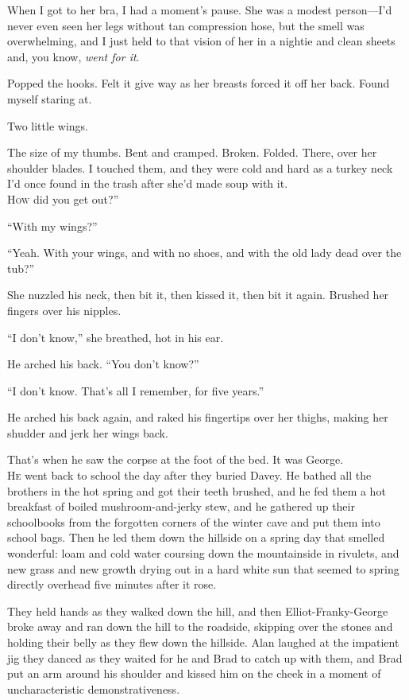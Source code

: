 \documentclass{article}
\begin{document}
When I got to her bra, I had a moment's pause.  She was a modest
person---I'd never even seen her legs without tan compression hose,
but the smell was overwhelming, and I just held to that vision of her
in a nightie and clean sheets and, you know, \textit{went for it}.

Popped the hooks.  Felt it give way as her breasts forced it off her
back.  Found myself staring at.

Two little wings.

The size of my thumbs.  Bent and cramped.  Broken.  Folded.  There,
over her shoulder blades.  I touched them, and they were cold and hard
as a turkey neck I'd once found in the trash after she'd made soup
with it.
\\
\lettrine[lines=3, lhang=.5, nindent=0pt, findent=2pt]{H}{ow}
did you get out?''

``With my wings?''

``Yeah.  With your wings, and with no shoes, and with the old lady
dead over the tub?''

She nuzzled his neck, then bit it, then kissed it, then bit it again. 
Brushed her fingers over his nipples.

``I don't know,'' she breathed, hot in his ear.

He arched his back.  ``You don't know?''

``I don't know.  That's all I remember, for five years.''

He arched his back again, and raked his fingertips over her thighs,
making her shudder and jerk her wings back.

That's when he saw the corpse at the foot of the bed.  It was George.
\\
\lettrine[lines=3, lhang=.5, nindent=0pt, findent=2pt]{H}{e} went back to school the day after they buried Davey.  He bathed all
the brothers in the hot spring and got their teeth brushed, and he fed
them a hot breakfast of boiled mushroom-and-jerky stew, and he
gathered up their schoolbooks from the forgotten corners of the winter
cave and put them into school bags.  Then he led them down the
hillside on a spring day that smelled wonderful:  loam and cold water
coursing down the mountainside in rivulets, and new grass and new
growth drying out in a hard white sun that seemed to spring directly
overhead five minutes after it rose.

They held hands as they walked down the hill, and then
Elliot-Franky-George broke away and ran down the hill to the roadside,
skipping over the stones and holding their belly as they flew down the
hillside.  Alan laughed at the impatient jig they danced as they
waited for he and Brad to catch up with them, and Brad put an arm
around his shoulder and kissed him on the cheek in a moment of
uncharacteristic demonstrativeness.
\end{document}
